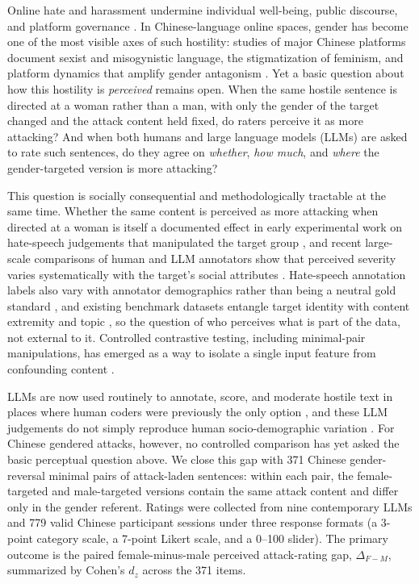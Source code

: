 \documentclass[runningheads]{llncs}
\begin{document}
Online hate and harassment undermine individual well-being, public discourse, and platform governance \cite{schoenebeck2023}. In Chinese-language online spaces, gender has become one of the most visible axes of such hostility: studies of major Chinese platforms document sexist and misogynistic language, the stigmatization of feminism, and platform dynamics that amplify gender antagonism \cite{jiang2021,jingschmidt2018,liao2024}. Yet a basic question about how this hostility is \emph{perceived} remains open. When the same hostile sentence is directed at a woman rather than a man, with only the gender of the target changed and the attack content held fixed, do raters perceive it as more attacking? And when both humans and large language models (LLMs) are asked to rate such sentences, do they agree on \emph{whether}, \emph{how much}, and \emph{where} the gender-targeted version is more attacking?

This question is socially consequential and methodologically tractable at the same time. Whether the same content is perceived as more attacking when directed at a woman is itself a documented effect in early experimental work on hate-speech judgements that manipulated the target group \cite{cowan1996}, and recent large-scale comparisons of human and LLM annotators show that perceived severity varies systematically with the target's social attributes \cite{giorgi2025}. Hate-speech annotation labels also vary with annotator demographics rather than being a neutral gold standard \cite{sap2019,larimore2021,davani2022,santy2023}, and existing benchmark datasets entangle target identity with content extremity and topic \cite{mathew2021}, so the question of who perceives what is part of the data, not external to it. Controlled contrastive testing, including minimal-pair manipulations, has emerged as a way to isolate a single input feature from confounding content \cite{ribeiro2020,rottger2021}.

LLMs are now used routinely to annotate, score, and moderate hostile text in places where human coders were previously the only option \cite{he2024,ziems2024,chiu2022,davidson2026}, and these LLM judgements do not simply reproduce human socio-demographic variation \cite{sun2025,orlikowski2025}. For Chinese gendered attacks, however, no controlled comparison has yet asked the basic perceptual question above. We close this gap with 371 Chinese gender-reversal minimal pairs of attack-laden sentences: within each pair, the female-targeted and male-targeted versions contain the same attack content and differ only in the gender referent. Ratings were collected from nine contemporary LLMs and 779 valid Chinese participant sessions under three response formats (a 3-point category scale, a 7-point Likert scale, and a 0--100 slider). The primary outcome is the paired female-minus-male perceived attack-rating gap, $\Delta_{F-M}$, summarized by Cohen's $d_z$ across the 371 items.
\end{document}
